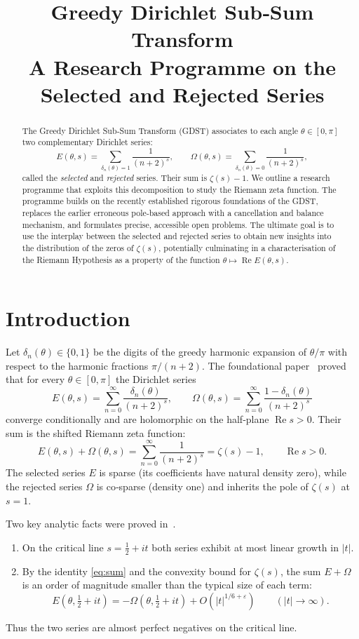 \documentclass[11pt,a4paper]{article}
\title{\bfseries Greedy Dirichlet Sub‑Sum Transform\\
\large A Research Programme on the Selected and Rejected Series}
\author{}
\date{}
\theoremstyle{definition}
\theoremstyle{remark}
\begin{document}
\maketitle

\begin{abstract}
The Greedy Dirichlet Sub‑Sum Transform (GDST) associates to each angle \(\theta\in[0,\pi]\) two complementary Dirichlet series:
\[
E(\theta,s)=\sum_{\delta_n(\theta)=1}\frac{1}{(n+2)^s},\qquad 
\Omega(\theta,s)=\sum_{\delta_n(\theta)=0}\frac{1}{(n+2)^s},
\]
called the \emph{selected} and \emph{rejected} series.
Their sum is \(\zeta(s)-1\).
We outline a research programme that exploits this decomposition to study the Riemann zeta function.
The programme builds on the recently established rigorous foundations of the GDST, replaces the earlier erroneous pole‑based approach with a cancellation and balance mechanism, and formulates precise, accessible open problems.
The ultimate goal is to use the interplay between the selected and rejected series to obtain new insights into the distribution of the zeros of \(\zeta(s)\), potentially culminating in a characterisation of the Riemann Hypothesis as a property of the function \(\theta\mapsto\operatorname{Re}E(\theta,s)\).
\end{abstract}

\section{Introduction}
Let \(\delta_n(\theta)\in\{0,1\}\) be the digits of the greedy harmonic expansion of \(\theta/\pi\) with respect to the harmonic fractions \(\pi/(n+2)\).
The foundational paper~\cite{GDSTfound} proved that for every \(\theta\in[0,\pi]\) the Dirichlet series
\[
E(\theta,s)=\sum_{n=0}^{\infty}\frac{\delta_n(\theta)}{(n+2)^s},\qquad 
\Omega(\theta,s)=\sum_{n=0}^{\infty}\frac{1-\delta_n(\theta)}{(n+2)^s}
\]
converge conditionally and are holomorphic on the half‑plane \(\operatorname{Re}s>0\).
Their sum is the shifted Riemann zeta function:
\begin{equation}\label{eq:sum}
E(\theta,s)+\Omega(\theta,s)=\sum_{n=0}^{\infty}\frac{1}{(n+2)^s}=\zeta(s)-1, \qquad \operatorname{Re}s>0.
\end{equation}
The selected series \(E\) is sparse (its coefficients have natural density zero), while the rejected series \(\Omega\) is co‑sparse (density one) and inherits the pole of \(\zeta(s)\) at \(s=1\).

Two key analytic facts were proved in~\cite{GDSTfound}.
\begin{enumerate}[label=(\arabic*)]
\item On the critical line \(s=\frac12+it\) both series exhibit at most linear growth in \(|t|\).
\item By the identity \eqref{eq:sum} and the convexity bound for \(\zeta(s)\), the sum \(E+\Omega\) is an order of magnitude smaller than the typical size of each term:
\[
E(\theta,\tfrac12+it)=-\Omega(\theta,\tfrac12+it)+O(|t|^{1/6+\varepsilon}) \qquad (|t|\to\infty).
\]
\end{enumerate}
Thus the two series are almost perfect negatives on the critical line.
\end{document}
